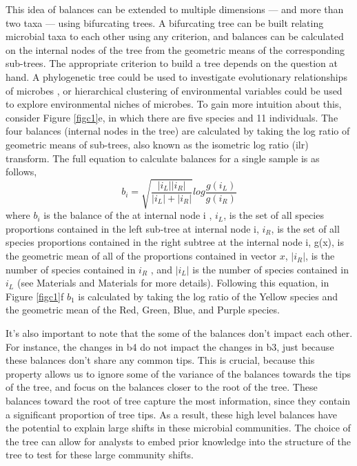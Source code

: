 This idea of balances can be extended to multiple dimensions — and more than two taxa — using bifurcating trees.  A bifurcating tree can be built relating microbial taxa to each other using any criterion, and balances can be calculated on the internal nodes of the tree from the geometric means of the corresponding sub-trees. The appropriate criterion to build a tree depends on the question at hand.  A phylogenetic tree could be used to investigate evolutionary relationships of microbes \cite{Silverman2018-ql, Washburne2017-up}, or hierarchical clustering of environmental variables could be used to explore environmental niches of microbes.  To gain more intuition about this, consider Figure \ref{figc1}e, in which there are five species and 11 individuals. The four balances (internal nodes in the tree) are calculated by taking the log ratio of geometric means of sub-trees, also known as the isometric log ratio (\gls{ilr}) transform.  The full equation to calculate balances for a single sample is as follows,
\begin{equation}
b_{i}=\sqrt{\frac{\left| i_{L}\right| \left| i_{R}\right|}{\left| i_{L}\right|+ \left| i_{R}\right|}}log \frac{g(i_{L})}{g(i_{R})}
\end{equation}
where $b_{i}$ is the balance of the at internal node i ,  $i_{L}$, is the set of all species proportions contained in the left sub-tree at internal node i, $i_{R}$,  is the set of all species proportions contained in the right subtree at the internal node  i, g(x),  is the geometric mean of all of the proportions contained in vector $x$, $ \left| i_{R}\right|$,  is the number of species contained in  $i_{R}$ , and  $ \left| i_{L}\right|$ is the number of species contained in $ i_{L}$ (see Materials and Materials for more details). Following this equation, in Figure \ref{figc1}f  $b_{1}$ is calculated by taking the log ratio of the Yellow species and the geometric mean of the Red, Green, Blue, and Purple species.  \par
 It's also important to note that the some of the balances don't impact each other.  For instance, the changes in b4 do not impact the changes in b3, just because these balances don't share any common tips.  This is crucial, because this property allows us to ignore some of the variance of the balances towards the tips of the tree, and focus on the balances closer to the root of the tree.  These balances toward the root of tree capture the most information, since they contain a significant proportion of tree tips.  As a result, these high level balances have the potential to explain large shifts in these microbial communities.  The choice of the tree can allow for analysts to embed prior knowledge into the structure of the tree to test for these large community shifts.\par
